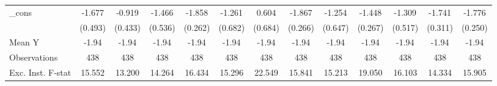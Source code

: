 {\begin{tabular}{l*{12}{c}}
\addlinespace
\_cons      &      -1.677\sym{***}&      -0.919\sym{**} &      -1.466\sym{**} &      -1.858\sym{***}&      -1.261\sym{*}  &       0.604         &      -1.867\sym{***}&      -1.254\sym{*}  &      -1.448\sym{***}&      -1.309\sym{**} &      -1.741\sym{***}&      -1.776\sym{***}\\
            &     (0.493)         &     (0.433)         &     (0.536)         &     (0.262)         &     (0.682)         &     (0.684)         &     (0.266)         &     (0.647)         &     (0.267)         &     (0.517)         &     (0.311)         &     (0.250)         \\
\midrule
Mean Y      &       -1.94         &       -1.94         &       -1.94         &       -1.94         &       -1.94         &       -1.94         &       -1.94         &       -1.94         &       -1.94         &       -1.94         &       -1.94         &       -1.94         \\
Observations&         438         &         438         &         438         &         438         &         438         &         438         &         438         &         438         &         438         &         438         &         438         &         438         \\
Exc. Inst. F-stat&      15.552         &      13.200         &      14.264         &      16.434         &      15.296         &      22.549         &      15.841         &      15.213         &      19.050         &      16.103         &      14.334         &      15.905         \\
\bottomrule
\end{tabular}
}
